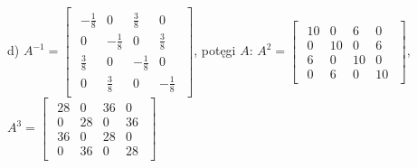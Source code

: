 \documentclass{article}
\begin{document}
\begin{description}
    d) $A^{-1} = \begin{bmatrix}\begin{array}{rrrr} -\frac{1}{8} & 0 & \frac{3}{8} & 0\\ 0 & -\frac{1}{8} & 0 & \frac{3}{8}\\ \frac{3}{8} & 0 & -\frac{1}{8} & 0\\ 0 & \frac{3}{8} & 0 & -\frac{1}{8} \end{array}\end{bmatrix}$, potęgi $A$: $A^{2} = \begin{bmatrix}\begin{array}{rrrr} 10 & 0 & 6 & 0\\ 0 & 10 & 0 & 6\\ 6 & 0 & 10 & 0\\ 0 & 6 & 0 & 10 \end{array}\end{bmatrix}$, $A^{3} = \begin{bmatrix}\begin{array}{rrrr} 28 & 0 & 36 & 0\\ 0 & 28 & 0 & 36\\ 36 & 0 & 28 & 0\\ 0 & 36 & 0 & 28 \end{array}\end{bmatrix}$
\end{description}
\end{document}
